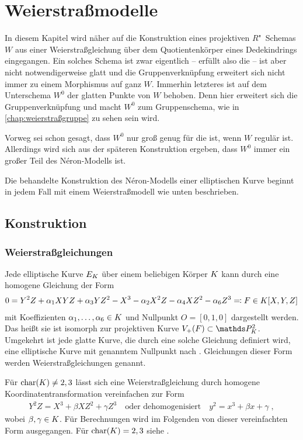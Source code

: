 \chapter{Weierstraßmodelle}\label{chap:weierstraßmodelle}
In diesem Kapitel wird näher auf die Konstruktion eines
projektiven $R$"~Schemas $W$ aus einer Weierstraßgleichung über dem
Quotientenkörper eines Dedekindrings eingegangen.
Ein solches Schema ist zwar eigentlich – erfüllt also die \NAbbEig – ist
aber nicht notwendigerweise glatt und die Gruppenverknüpfung
erweitert sich nicht immer zu einem Morphismus auf ganz $W$.
Immerhin letzteres ist auf dem Unterschema $W^0$ der glatten Punkte
von $W$ behoben. Denn hier erweitert sich die Gruppenverknüpfung und
macht $W^0$ zum Gruppenschema, wie in \autoref{chap:weierstraßgruppe}
zu sehen sein wird.

Vorweg sei schon gesagt, dass $W^0$ nur groß genug für die
\NAbbEig ist, wenn $W$ regulär ist. Allerdings wird sich aus
der späteren Konstruktion ergeben, dass $W^0$ immer ein großer Teil
des Néron-Modells ist.

Die behandelte Konstruktion des Néron-Modells einer elliptischen Kurve
beginnt in jedem Fall mit einem Weierstraßmodell wie unten beschrieben.

\section{Konstruktion}
\subsection{Weierstraßgleichungen}
Jede elliptische Kurve $E_{K}$ über einem beliebigen Körper $K$ kann
durch eine homogene Gleichung der Form
\begin{gather*}
  0 = Y^2 Z + \alpha_1 XYZ + \alpha_3 YZ^2 - X^3 - \alpha_2X^2 Z - \alpha_4 XZ^2 - \alpha_6 Z^3
  \eqqcolon F\in K[X,Y,Z]
\end{gather*}
mit Koeffizienten $\alpha_1,\dotsc,\alpha_6\in K$ und Nullpunkt $O=[0,1,0]$
dargestellt werden. Das heißt sie ist isomorph zur projektiven Kurve
$V_+(F)\subset\P_\K^2$.
Umgekehrt ist jede glatte Kurve, die durch eine
solche Gleichung definiert wird, eine elliptische Kurve mit genanntem
Nullpunkt nach \cite[Proposition~III.3.1]{silverman}.
Gleichungen dieser Form werden Weierstraßgleichungen genannt.

Für $\operatorname{char}(K)\neq 2,3$ lässt sich eine Weierstraßgleichung durch
homogene Koordinatentransformation vereinfachen zur Form
\begin{gather*}
  Y^2 Z = X^3 + \beta XZ^2 + \gamma Z^3
  \quad\text{oder dehomogenisiert}\quad
  y^2 = x^3 + \beta x + \gamma\;,
\end{gather*}
wobei $\beta,\gamma\in K$.
Für Berechnungen wird im Folgenden von dieser vereinfachten Form
ausgegangen. Für $\operatorname{char}(K)=2,3$ siehe
\cite[Appendix: Elliptic Curves in Characteristics 2~and 3]{silverman}.


